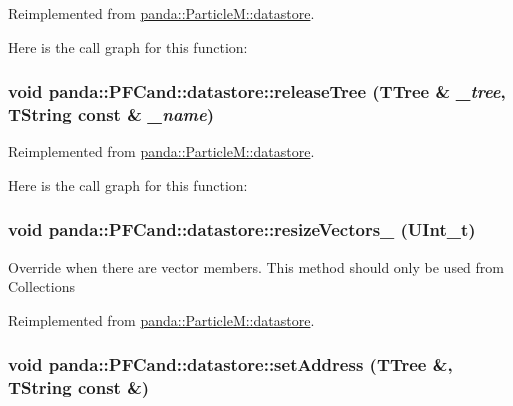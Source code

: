 Reimplemented from \hyperlink{structpanda_1_1ParticleM_1_1datastore_a4069b8cdca5715ed6faf0a7907ea8386}{panda::ParticleM::datastore}.

Here is the call graph for this function:\hypertarget{structpanda_1_1PFCand_1_1datastore_a9fc7ec497f046c098b89eb04ee508174}{
\subsubsection[{releaseTree}]{\setlength{\rightskip}{0pt plus 5cm}void panda::PFCand::datastore::releaseTree (TTree \& {\em \_\-tree}, \/  TString const \& {\em \_\-name})}}
\label{structpanda_1_1PFCand_1_1datastore_a9fc7ec497f046c098b89eb04ee508174}


Reimplemented from \hyperlink{structpanda_1_1ParticleM_1_1datastore_ad6986990fa55f1c6ca4e92db28486922}{panda::ParticleM::datastore}.

Here is the call graph for this function:\hypertarget{structpanda_1_1PFCand_1_1datastore_a3e3acf6cc81f4ebe16220a7931b3bb2d}{
\subsubsection[{resizeVectors\_\-}]{\setlength{\rightskip}{0pt plus 5cm}void panda::PFCand::datastore::resizeVectors\_\- (UInt\_\-t)}}
\label{structpanda_1_1PFCand_1_1datastore_a3e3acf6cc81f4ebe16220a7931b3bb2d}


Override when there are vector members. This method should only be used from Collections 

Reimplemented from \hyperlink{structpanda_1_1ParticleM_1_1datastore_a6dd61d4a8f70e81a1638757a5edbc7ed}{panda::ParticleM::datastore}.\hypertarget{structpanda_1_1PFCand_1_1datastore_a9f79eb8960ad6be9157ed49ec37f4258}{
\subsubsection[{setAddress}]{\setlength{\rightskip}{0pt plus 5cm}void panda::PFCand::datastore::setAddress (TTree \&, \/  TString const \&)}}
\label{structpanda_1_1PFCand_1_1datastore_a9f79eb8960ad6be9157ed49ec37f4258}


